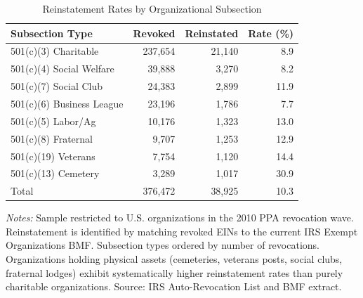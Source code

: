 \begin{table}[htbp]
\centering
\caption{Reinstatement Rates by Organizational Subsection}
\label{tab:subsection}
\begin{tabular}{lrrr}
\toprule
Subsection Type & Revoked & Reinstated & Rate (\%) \\
\midrule
501(c)(3) Charitable & 237,654 & 21,140 & 8.9 \\
501(c)(4) Social Welfare & 39,888 & 3,270 & 8.2 \\
501(c)(7) Social Club & 24,383 & 2,899 & 11.9 \\
501(c)(6) Business League & 23,196 & 1,786 & 7.7 \\
501(c)(5) Labor/Ag & 10,176 & 1,323 & 13.0 \\
501(c)(8) Fraternal & 9,707 & 1,253 & 12.9 \\
501(c)(19) Veterans & 7,754 & 1,120 & 14.4 \\
501(c)(13) Cemetery & 3,289 & 1,017 & 30.9 \\
\midrule
Total & 376,472 & 38,925 & 10.3 \\
\bottomrule
\end{tabular}
\begin{tablenotes}
\item \textit{Notes:} Sample restricted to U.S. organizations in the 2010 PPA revocation wave. Reinstatement is identified by matching revoked EINs to the current IRS Exempt Organizations BMF. Subsection types ordered by number of revocations. Organizations holding physical assets (cemeteries, veterans posts, social clubs, fraternal lodges) exhibit systematically higher reinstatement rates than purely charitable organizations. Source: IRS Auto-Revocation List and BMF extract.
\end{tablenotes}
\end{table}
